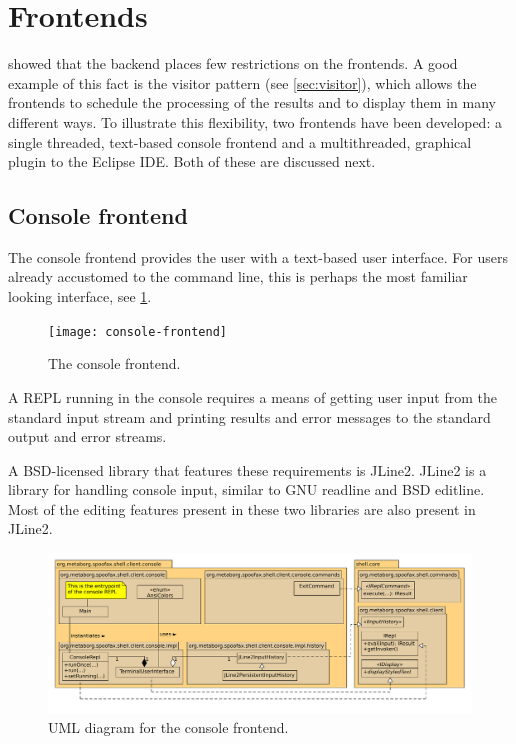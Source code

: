 \section{Frontends}
\label{sec:frontends}

 showed that the backend places few restrictions on the
frontends. A good example of this fact is the visitor pattern (see
\cref{sec:visitor}), which allows the frontends to schedule the processing of
the results and to display them in many different ways.  To illustrate this
flexibility, two frontends have been developed: a single threaded, text-based
console frontend and a multithreaded, graphical plugin to the Eclipse IDE. Both of these
are discussed next.

\subsection{Console frontend}
\label{ssec:consolerepl}

The console frontend provides the user with a text-based user interface. For users
already accustomed to the command line, this is perhaps the most familiar
looking interface, see \cref{fig:frontend-console}.

\begin{figure}[h]
  \texttt{[image: console-frontend]}
  \caption{The console frontend.}
  \label{fig:frontend-console}
\end{figure}

A REPL running in the console requires a means of getting
user input from the standard input stream and printing results and error
messages to the standard output and error streams.

A BSD-licensed library that features these requirements is JLine2.
JLine2 is a library for handling console input, similar to GNU readline and BSD
editline. Most of the editing features present in these two libraries are also
present in JLine2.

\begin{figure}[h]
  \includegraphics[width=\textwidth]{uml-console}
  \caption{UML diagram for the console frontend.}
  \label{fig:uml-console}
\end{figure}

